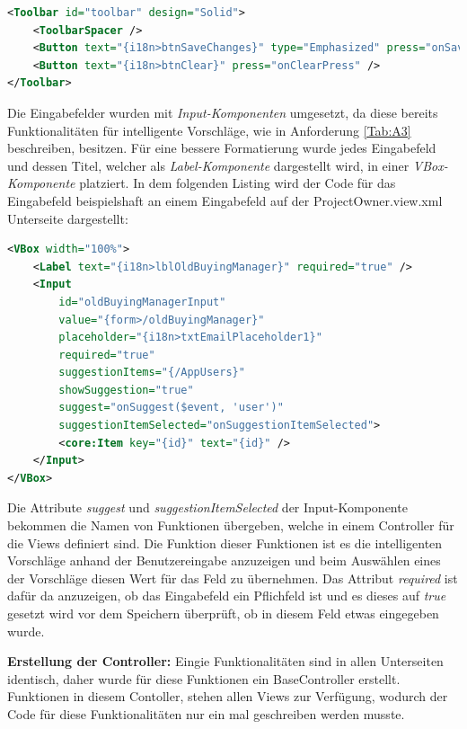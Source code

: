 \begin{lstlisting}[caption={Toolbar der Unterseiten}, label={lst:toolbar}, language={XML}]
<Toolbar id="toolbar" design="Solid">
    <ToolbarSpacer />
    <Button text="{i18n>btnSaveChanges}" type="Emphasized" press="onSaveChangesPress" />
    <Button text="{i18n>btnClear}" press="onClearPress" />
</Toolbar>
\end{lstlisting}

Die Eingabefelder wurden mit \textit{Input-Komponenten} umgesetzt, da diese bereits Funktionalitäten für intelligente Vorschläge, wie in Anforderung \ref{Tab:A3} beschreiben, besitzen.
Für eine bessere Formatierung wurde jedes Eingabefeld und dessen Titel, welcher als \textit{Label-Komponente} dargestellt wird, in einer \textit{VBox-Komponente} platziert.
In dem folgenden Listing wird der Code für das Eingabefeld beispielshaft an einem Eingabefeld auf der ProjectOwner.view.xml Unterseite dargestellt:

\begin{lstlisting}[caption={Eingabefeld für Unterseiten}, language={XML}]
<VBox width="100%">
    <Label text="{i18n>lblOldBuyingManager}" required="true" />
    <Input
        id="oldBuyingManagerInput"
        value="{form>/oldBuyingManager}"
        placeholder="{i18n>txtEmailPlaceholder1}"
        required="true"
        suggestionItems="{/AppUsers}"
        showSuggestion="true"
        suggest="onSuggest($event, 'user')"
        suggestionItemSelected="onSuggestionItemSelected">
        <core:Item key="{id}" text="{id}" />
    </Input>
</VBox>
\end{lstlisting}

Die Attribute \textit{suggest} und \textit{suggestionItemSelected} der Input-Komponente bekommen die Namen von Funktionen übergeben, welche in einem Controller für die Views definiert sind.
Die Funktion dieser Funktionen ist es die intelligenten Vorschläge anhand der Benutzereingabe anzuzeigen und beim Auswählen eines der Vorschläge diesen Wert für das Feld zu übernehmen.
Das Attribut \textit{required} ist dafür da anzuzeigen, ob das Eingabefeld ein Pflichfeld ist und es dieses auf \textit{true} gesetzt wird vor dem Speichern überprüft, ob in diesem Feld etwas eingegeben wurde.

\textbf{Erstellung der Controller:}
Eingie Funktionalitäten sind in allen Unterseiten identisch, daher wurde für diese Funktionen ein BaseController erstellt.
Funktionen in diesem Contoller, stehen allen Views zur Verfügung, wodurch der Code für diese Funktionalitäten nur ein mal geschreiben werden musste.

